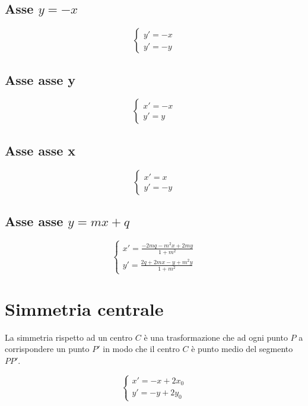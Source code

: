 \subsection{Asse $y=-x$}
\begin{tcolorbox}[sidebyside,righthand width=7cm,colback=white,colframe=white,fonttitle=\bfseries	]
	\[\begin{cases}
	y'=-x\\
	y'=-y
	\end{cases}
	\]
	\tcblower
	
\end{tcolorbox}
\subsection{Asse asse y}
\begin{tcolorbox}[sidebyside,righthand width=7cm,colback=white,colframe=white,fonttitle=\bfseries	]
	\[\begin{cases}
	x'=-x\\
	y'=y
	\end{cases}
	\]
	\tcblower
		
\end{tcolorbox}
\subsection{Asse asse x}
\begin{tcolorbox}[sidebyside,righthand width=7cm,colback=white,colframe=white,fonttitle=\bfseries	]
	\[\begin{cases}
	x'=x\\
	y'=-y
	\end{cases}
	\]
	\tcblower
	
\end{tcolorbox}
\subsection{Asse asse $y=mx+q$}
\begin{tcolorbox}[sidebyside,righthand width=7cm,colback=white,colframe=white,fonttitle=\bfseries	]
	\[\begin{cases}
	x'=\frac{-2mq-m^2x+2my}{1+m^2}\\
	y'=\frac{2q+2mx-y+m^2y}{1+m^2}
	\end{cases}
	\]
	\tcblower
	
\end{tcolorbox}
\section{Simmetria centrale}
La simmetria rispetto ad un centro $C$ è una trasformazione che ad ogni punto $P$ a corrispondere un punto $P'$ in modo che il centro $C$ è punto medio del segmento $PP'$.
\begin{tcolorbox}[sidebyside,righthand width=7cm,colback=white,colframe=white,fonttitle=\bfseries	]
	\[\begin{cases}
	x'=-x+2x_0\\
	y'=-y+2y_0
	\end{cases}
	\]
	\tcblower
	
\end{tcolorbox}